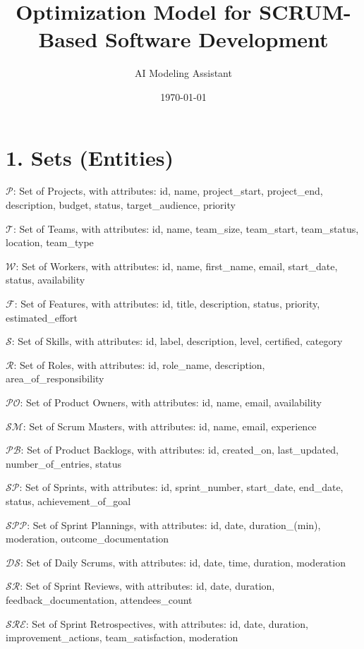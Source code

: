 \documentclass[12pt]{article}
\title{Optimization Model for SCRUM-Based Software Development}
\author{AI Modeling Assistant}
\date{\today}
\begin{document}
\maketitle
\tableofcontents
\newpage

\section{1. Sets (Entities)}
\item $ \mathcal{P} $: Set of Projects, with attributes: id, name, project\_start, project\_end, description, budget, status, target\_audience, priority
    \item $ \mathcal{T} $: Set of Teams, with attributes: id, name, team\_size, team\_start, team\_status, location, team\_type
    \item $ \mathcal{W} $: Set of Workers, with attributes: id, name, first\_name, email, start\_date, status, availability
    \item $ \mathcal{F} $: Set of Features, with attributes: id, title, description, status, priority, estimated\_effort
    \item $ \mathcal{S} $: Set of Skills, with attributes: id, label, description, level, certified, category
    \item $ \mathcal{R} $: Set of Roles, with attributes: id, role\_name, description, area\_of\_responsibility
    \item $ \mathcal{PO} $: Set of Product Owners, with attributes: id, name, email, availability
    \item $ \mathcal{SM} $: Set of Scrum Masters, with attributes: id, name, email, experience
    \item $ \mathcal{PB} $: Set of Product Backlogs, with attributes: id, created\_on, last\_updated, number\_of\_entries, status
    \item $ \mathcal{SP} $: Set of Sprints, with attributes: id, sprint\_number, start\_date, end\_date, status, achievement\_of\_goal
    \item $ \mathcal{SPP} $: Set of Sprint Plannings, with attributes: id, date, duration\_(min), moderation, outcome\_documentation
    \item $ \mathcal{DS} $: Set of Daily Scrums, with attributes: id, date, time, duration, moderation
    \item $ \mathcal{SR} $: Set of Sprint Reviews, with attributes: id, date, duration, feedback\_documentation, attendees\_count
    \item $ \mathcal{SRE} $: Set of Sprint Retrospectives, with attributes: id, date, duration, improvement\_actions, team\_satisfaction, moderation
\end{document}
